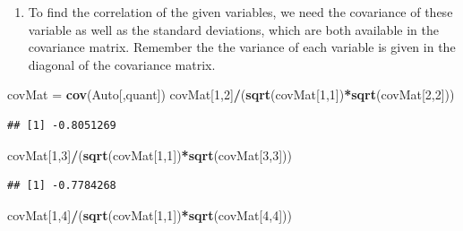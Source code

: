\documentclass[]{article}
\newenvironment{Shaded}{\begin{snugshade}}{\end{snugshade}}
\newcommand{\KeywordTok}[1]{\textcolor[rgb]{0.13,0.29,0.53}{\textbf{#1}}}
\newcommand{\DecValTok}[1]{\textcolor[rgb]{0.00,0.00,0.81}{#1}}
\newcommand{\StringTok}[1]{\textcolor[rgb]{0.31,0.60,0.02}{#1}}
\newcommand{\OperatorTok}[1]{\textcolor[rgb]{0.81,0.36,0.00}{\textbf{#1}}}
\newcommand{\NormalTok}[1]{#1}
\providecommand{\tightlist}{%
  \setlength{\itemsep}{0pt}\setlength{\parskip}{0pt}}
\begin{document}
\begin{enumerate}
\def\labelenumi{\alph{enumi})}
\setcounter{enumi}{6}
\tightlist
\item
  To find the correlation of the given variables, we need the covariance
  of these variable as well as the standard deviations, which are both
  available in the covariance matrix. Remember the the variance of each
  variable is given in the diagonal of the covariance matrix.
\end{enumerate}

\begin{Shaded}
\begin{Highlighting}[]
\NormalTok{covMat =}\StringTok{ }\KeywordTok{cov}\NormalTok{(Auto[,quant])}
\NormalTok{covMat[}\DecValTok{1}\NormalTok{,}\DecValTok{2}\NormalTok{]}\OperatorTok{/}\NormalTok{(}\KeywordTok{sqrt}\NormalTok{(covMat[}\DecValTok{1}\NormalTok{,}\DecValTok{1}\NormalTok{])}\OperatorTok{*}\KeywordTok{sqrt}\NormalTok{(covMat[}\DecValTok{2}\NormalTok{,}\DecValTok{2}\NormalTok{]))}
\end{Highlighting}
\end{Shaded}

\begin{verbatim}
## [1] -0.8051269
\end{verbatim}

\begin{Shaded}
\begin{Highlighting}[]
\NormalTok{covMat[}\DecValTok{1}\NormalTok{,}\DecValTok{3}\NormalTok{]}\OperatorTok{/}\NormalTok{(}\KeywordTok{sqrt}\NormalTok{(covMat[}\DecValTok{1}\NormalTok{,}\DecValTok{1}\NormalTok{])}\OperatorTok{*}\KeywordTok{sqrt}\NormalTok{(covMat[}\DecValTok{3}\NormalTok{,}\DecValTok{3}\NormalTok{]))}
\end{Highlighting}
\end{Shaded}

\begin{verbatim}
## [1] -0.7784268
\end{verbatim}

\begin{Shaded}
\begin{Highlighting}[]
\NormalTok{covMat[}\DecValTok{1}\NormalTok{,}\DecValTok{4}\NormalTok{]}\OperatorTok{/}\NormalTok{(}\KeywordTok{sqrt}\NormalTok{(covMat[}\DecValTok{1}\NormalTok{,}\DecValTok{1}\NormalTok{])}\OperatorTok{*}\KeywordTok{sqrt}\NormalTok{(covMat[}\DecValTok{4}\NormalTok{,}\DecValTok{4}\NormalTok{]))}
\end{Highlighting}
\end{Shaded}
\end{document}
